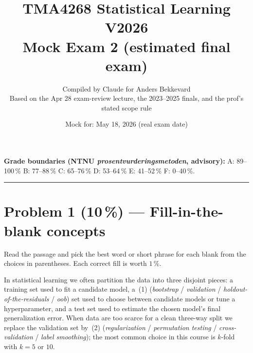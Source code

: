 \documentclass[11pt,a4paper]{article}
\title{TMA4268 Statistical Learning V2026\\[0.3em]
\large Mock Exam 2 (estimated final exam)}
\author{Compiled by Claude for Anders Bekkevard\\[0.2em]
\small Based on the Apr 28 exam-review lecture, the 2023--2025 finals, and the prof's stated scope rule}
\date{Mock for: May 18, 2026 (real exam date)}
\newcommand{\points}[1]{\textbf{(#1\,\%)}}
\begin{document}
\maketitle

\noindent{}

\vspace{0.6em}
\noindent\textbf{Grade boundaries (NTNU \emph{prosentvurderingsmetoden}, advisory):}
A: 89--100\,\% \quad B: 77--88\,\% \quad C: 65--76\,\% \quad D: 53--64\,\% \quad E: 41--52\,\% \quad F: 0--40\,\%.

\vspace{1em}
\hrule
\vspace{1em}

\section*{Problem 1 \points{10} --- Fill-in-the-blank concepts}

\noindent Read the passage and pick the best word or short phrase for each blank from the choices in parentheses. Each correct fill is worth $1$\,\%.

\bigskip

In statistical learning we often partition the data into three disjoint pieces: a training set used to fit a candidate model, a \underline{\hspace{2cm}}\,(1) (\emph{bootstrap} / \emph{validation} / \emph{holdout-of-the-residuals} / \emph{oob}) set used to choose between candidate models or tune a hyperparameter, and a test set used to estimate the chosen model's final generalization error. When data are too scarce for a clean three-way split we replace the validation set by \underline{\hspace{2cm}}\,(2) (\emph{regularization} / \emph{permutation testing} / \emph{cross-validation} / \emph{label smoothing}); the most common choice in this course is $k$-fold with $k = 5$ or $10$.
\end{document}
